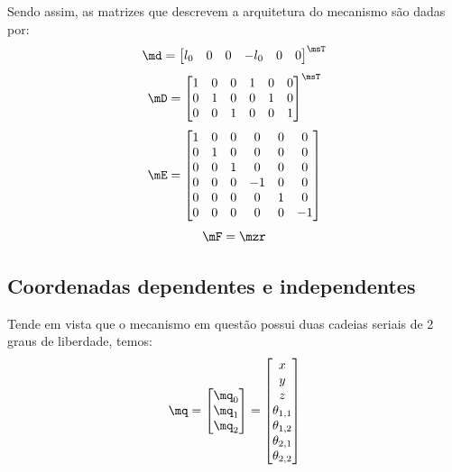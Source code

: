\documentclass[]{politex}
\begin{document}
Sendo assim, as matrizes que descrevem a arquitetura do mecanismo são dadas por:
\begin{equation}
\md = \begin{bmatrix}
l_0 &
0 &
0 &
-l_0 &
0 &
0 
\end{bmatrix}^\msT
\end{equation}
\begin{equation}
\mD = \begin{bmatrix}
1 & 0 & 0 & 1 & 0 & 0 \\
0 & 1 & 0 & 0 & 1 & 0 \\
0 & 0 & 1 & 0 & 0 & 1 \\
\end{bmatrix}^\msT
\end{equation}
\begin{equation}
\mE = \begin{bmatrix}
1 & 0 & 0 & 0 & 0 & 0 \\
0 & 1 & 0 & 0 & 0 & 0 \\
0 & 0 & 1 & 0 & 0 & 0 \\
0 & 0 & 0 & -1 & 0 & 0 \\
0 & 0 & 0 & 0 & 1 & 0 \\
0 & 0 & 0 & 0 & 0 & -1 \\
\end{bmatrix}
\end{equation}
\begin{equation}
\mF = \mzr
\end{equation}

\subsection{Coordenadas dependentes e independentes}

Tende em vista que o mecanismo em questão possui duas cadeias seriais de 2 graus de liberdade, temos:
\begin{equation}
\mq = \begin{bmatrix}
\mq_0 \\
\mq_1 \\
\mq_2
\end{bmatrix} =
\begin{bmatrix}
x \\
y \\
z \\
\theta_{1,1} \\
\theta_{1,2} \\
\theta_{2,1} \\
\theta_{2,2} \\
\end{bmatrix}
\end{equation}
\end{document}
